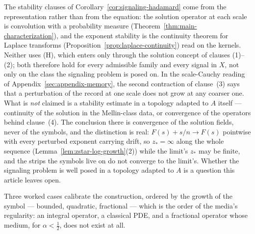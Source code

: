 \begin{remark}\label{rem:signaling-stability}
The stability clauses of Corollary~\ref{cor:signaling-hadamard} come from the representation rather
than from the equation: the solution operator at each scale is convolution with a
probability measure (Theorem~\ref{thm:main-characterization}), and the exponent stability is the
continuity theorem for Laplace transforms (Proposition~\ref{prop:laplace-continuity}) read on the
kernels. Neither uses (H), which enters only through the solution concept of clauses
(1)--(2); both therefore hold for every admissible family and every signal in $X$, not
only on the class the signaling problem is posed on. In the scale-Cauchy reading of
Appendix~\ref{sec:appendix-memory}, the second contraction of clause~(3) says that a perturbation of
the record at one scale does not grow at any coarser one. What is \emph{not} claimed is a
stability estimate in a topology adapted to $A$ itself --- continuity of the solution in
the Mellin-class data, or convergence of the operators behind clause~(4). The conclusion
there is convergence of the solution fields, never of the symbols, and the distinction is
real: $F(s) + s/n \to F(s)$ pointwise with every perturbed exponent carrying drift, so
$z_* = \infty$ along the whole sequence (Lemma~\ref{lem:zstar-log-growth}(2)) while the limit's
$z_*$ may be finite, and the strips the symbols live on do not converge to the limit's.
Whether the signaling problem is well posed in a topology adapted to $A$ is a question
this article leaves open.
\end{remark}

Three worked cases calibrate the construction, ordered by the growth of the symbol ---
bounded, quadratic, fractional --- which is the order of the media's regularity: an
integral operator, a classical PDE, and a fractional operator whose medium, for
$\alpha < \tfrac12$, does not exist at all.

